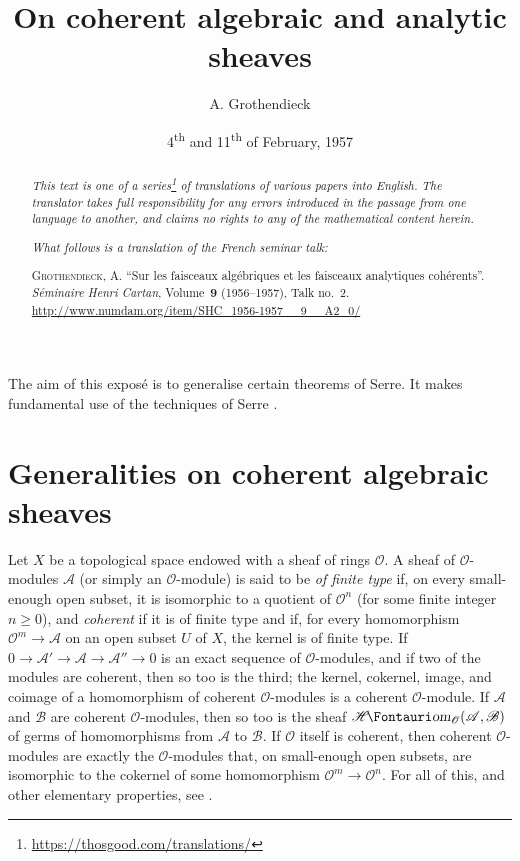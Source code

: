 \documentclass{article}
\title{On coherent algebraic and analytic sheaves}
\author{A. Grothendieck}
\date{4\textsuperscript{th} and 11\textsuperscript{th} of February, 1957}
\theoremstyle{plain}
\theoremstyle{definition}
\newcommand{\sh}[1]{{\mathscr{#1}}}
\newcommand{\shHom}{\sh{H}\textup{\kern-2.2pt{\Fontauri\slshape om}}}
\renewcommand{\geq}{\geqslant}
\newcommand{\oldpage}[1]{\marginpar{\footnotesize$\Big\vert$ \textit{p.~#1}}}
\begin{document}
\maketitle
\thispagestyle{fancy}

\renewcommand{\abstractname}{Translator's note.}

\begin{abstract}
  \renewcommand*{\thefootnote}{\fnsymbol{footnote}}
  \emph{This text is one of a series\footnote{\url{https://thosgood.com/translations/}} of translations of various papers into English.}
  \emph{The translator takes full responsibility for any errors introduced in the passage from one language to another, and claims no rights to any of the mathematical content herein.}

  \medskip
  
  \emph{What follows is a translation of the French seminar talk:}

  \medskip\noindent
  \textsc{Grothendieck, A.}
  ``Sur les faisceaux alg\'{e}briques et les faisceaux analytiques coh\'{e}rents''.
  \emph{S\'{e}minaire Henri Cartan}, Volume~\textbf{9} (1956--1957), Talk no.~2.
  {\url{http://www.numdam.org/item/SHC_1956-1957__9__A2_0/}}
\end{abstract}

\setcounter{footnote}{0}

\tableofcontents
\bigskip



The aim of this expos\'{e} is to generalise certain theorems of Serre.
\oldpage{2-01}
It makes fundamental use of the techniques of Serre \cite{1,2,3}.


\section{Generalities on coherent algebraic sheaves}
\label{section1}

Let $X$ be a topological space endowed with a sheaf of rings $\sh{O}$.
A sheaf of $\sh{O}$-modules $\sh{A}$ (or simply an $\sh{O}$-module) is said to be \emph{of finite type} if, on every small-enough open subset, it is isomorphic to a quotient of $\sh{O}^n$ (for some finite integer $n\geq0$), and \emph{coherent} if it is of finite type and if, for every homomorphism $\sh{O}^m\to\sh{A}$ on an open subset $U$ of $X$, the kernel is of finite type.
If $0\to\sh{A}'\to\sh{A}\to\sh{A}''\to0$ is an exact sequence of $\sh{O}$-modules, and if two of the modules are coherent, then so too is the third;
the kernel, cokernel, image, and coimage of a homomorphism of coherent $\sh{O}$-modules is a coherent $\sh{O}$-module.
If $\sh{A}$ and $\sh{B}$ are coherent $\sh{O}$-modules, then so too is the sheaf $\shHom_\sh{O}(\sh{A},\sh{B})$ of germs of homomorphisms from $\sh{A}$ to $\sh{B}$.
If $\sh{O}$ itself is coherent, then coherent $\sh{O}$-modules are exactly the $\sh{O}$-modules that, on small-enough open subsets, are isomorphic to the cokernel of some homomorphism $\sh{O}^m\to\sh{O}^n$.
For all of this, and other elementary properties, see \cite[chapitre~1, paragraphe~2]{1}.
\end{document}
